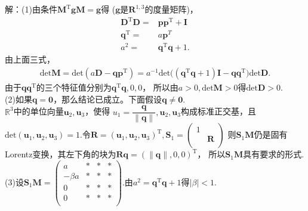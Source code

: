 \begin{enumerate}
    解：(1)由条件$\boldsymbol{M}^{\text{T}}\boldsymbol{g}\boldsymbol{M}=\boldsymbol{g}$得
    ($\boldsymbol{g}$是$\mathbf{R}^{1,3}$的度量矩阵)，
    \begin{align*}
        \boldsymbol{D}^{\text{T}}\boldsymbol{D}=&\boldsymbol{p}\boldsymbol{p}^{\text{T}}+\boldsymbol{I}\\
        \boldsymbol{q}^{\text{T}}=&a\boldsymbol{p}^{T}\\
        a^2=&\boldsymbol{q}^{\text{T}}\boldsymbol{q}+1.
    \end{align*}
    由上面三式，
    \begin{align*}
        \text{det}\boldsymbol{M}=\text{det}(a\boldsymbol{D}-\boldsymbol{q}\boldsymbol{p}^{\text{T}})
        =a^{-1}\text{det}\Big((\boldsymbol{q}^{\text{T}}\boldsymbol{q}+1)\boldsymbol{I}-\boldsymbol{q}
        \boldsymbol{q}^{\text{T}}\Big)\text{det}\boldsymbol{D}.
    \end{align*}
    由于$\boldsymbol{q}\boldsymbol{q}^{\text{T}}$的三个特征值分别为$\boldsymbol{q}^{\text{T}}\boldsymbol{q},0,0$，
    所以由$a>0,\text{det}\boldsymbol{M}>0$得$\text{det}\boldsymbol{D}>0$.\\
    (2)如果$\boldsymbol{q}=\boldsymbol{0}$，那么结论已成立。下面假设$\boldsymbol{q}\neq \boldsymbol{0}$.\\
    $\mathbb{R}^3$中的单位向量$\boldsymbol{u}_2, \boldsymbol{u}_3$，使得
    $u_1=\dfrac{\boldsymbol{q}}{\|\boldsymbol{q}\|},\boldsymbol{u}_2, \boldsymbol{u}_3$构成标准正交基，且
    $\text{det}(\boldsymbol{u}_1,\boldsymbol{u}_2, \boldsymbol{u}_3)=1$.令$\boldsymbol{R}=(\boldsymbol{u}_1,\boldsymbol{u}_2, \boldsymbol{u}_3)^{\text{T}},
    \boldsymbol S_1=\begin{pmatrix}
        1 & \  \\
        \ & \boldsymbol{R}\\
    \end{pmatrix}$ 
    则$\boldsymbol{S}_1\boldsymbol{M}$仍是固有Lorentz变换，其左下角的块为$\boldsymbol{R}\boldsymbol{q}=(\|\boldsymbol{q}\|,0,0)^{\text{T}}$，
    所以$\boldsymbol{S}_1\boldsymbol{M}$具有要求的形式.\\
    (3)设$\boldsymbol{S}_1\boldsymbol{M}=\begin{pmatrix}
        a & * & * & * \\
        -\beta a & * & * & *\\
        0 & * & * & * \\
        0 & * & * & * \\
    \end{pmatrix}$.由$a^2=\boldsymbol{q}^{\text{T}}\boldsymbol{q}+1$得$|\beta|<1$.

\end{enumerate}
